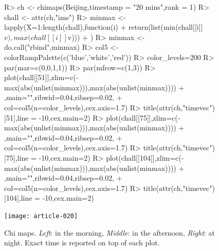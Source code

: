 \documentclass[article]{jss}
\begin{document}
\begin{figure}[!h]
\begin{center}
\begin{Sinput}
R>  ch <- chimaps(Beijing,timestamp = "20 mins",rank = 1)
R>  chall <- attr(ch,"ims")
R>  minmax <- lapply(X=1:length(chall),function(i){
+       return(list(min(chall[[i]]$v),max(chall[[i]]$v)))
+     })
R>  minmax <- do.call("rbind",minmax)
R>  col5 <- colorRampPalette(c('blue','white','red'))
R>  color_levels=200
R>  par(mar=c(0,0,1,1))
R>  par(mfrow=c(1,3))
R>  plot(chall[[51]],zlim=c(-max(abs(unlist(minmax))),max(abs(unlist(minmax))))
+        ,main="",ribwid=0.04,ribsep=0.02,
+        col=col5(n=color_levels),cex.axis=1.7)
R>  title(attr(ch,"timevec")[51],line = -10,cex.main=2)
R>  plot(chall[[75]],zlim=c(-max(abs(unlist(minmax))),max(abs(unlist(minmax))))
+        ,main="",ribwid=0.04,ribsep=0.02,
+        col=col5(n=color_levels),cex.axis=1.7)
R>  title(attr(ch,"timevec")[75],line = -10,cex.main=2)
R>  plot(chall[[104]],zlim=c(-max(abs(unlist(minmax))),max(abs(unlist(minmax))))
+        ,main="",ribwid=0.04,ribsep=0.02,
+        col=col5(n=color_levels),cex.axis=1.7)
R>  title(attr(ch,"timevec")[104],line = -10,cex.main=2)
\end{Sinput}
\texttt{[image: article-020]}
\end{center}
\caption{Chi maps. \emph{Left}: in the morning, \emph{Middle}: in the afternoon, \emph{Right}: at night.  Exact time is reported on top of each plot.}
\label{bijingchi}
\end{figure}

\end{document}
